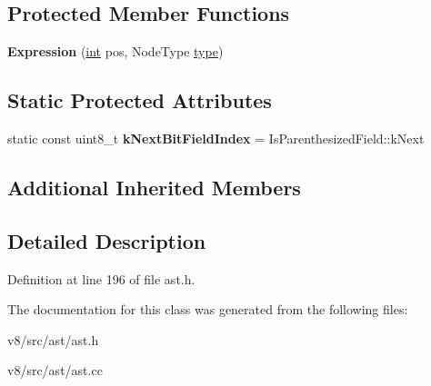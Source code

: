 \subsection*{Protected Member Functions}
\begin{DoxyCompactItemize}
\item 
\mbox{\label{classv8_1_1internal_1_1Expression_ac61d72ebdd7aa404bcd623a189dc30d2}} 
{\bfseries Expression} (\mbox{\hyperlink{classint}{int}} pos, Node\+Type \mbox{\hyperlink{classstd_1_1conditional_1_1type}{type}})
\end{DoxyCompactItemize}
\subsection*{Static Protected Attributes}
\begin{DoxyCompactItemize}
\item 
\mbox{\label{classv8_1_1internal_1_1Expression_a5f2d484725d68789995bfaabc1b95a1b}} 
static const uint8\+\_\+t {\bfseries k\+Next\+Bit\+Field\+Index} = Is\+Parenthesized\+Field\+::k\+Next
\end{DoxyCompactItemize}
\subsection*{Additional Inherited Members}


\subsection{Detailed Description}


Definition at line 196 of file ast.\+h.



The documentation for this class was generated from the following files\+:\begin{DoxyCompactItemize}
\item 
v8/src/ast/ast.\+h\item 
v8/src/ast/ast.\+cc\end{DoxyCompactItemize}
